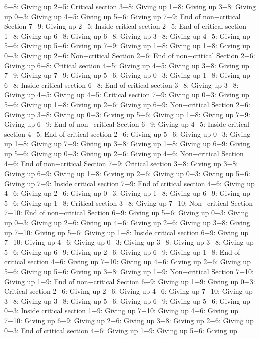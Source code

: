 6−8: Giving up
2−5: Critical section
3−8: Giving up
1−8: Giving up
3−8: Giving up
0−3: Giving up
4−5: Giving up
5−6: Giving up
7−9: End of non−critical Section
7−9: Giving up
2−5: Inside critical section
2−5: End of critical section
1−8: Giving up
6−8: Giving up
6−8: Giving up
3−8: Giving up
4−5: Giving up
5−6: Giving up
5−6: Giving up
7−9: Giving up
1−8: Giving up
1−8: Giving up
0−3: Giving up
2−6: Non−critical Section
2−6: End of non−critical Section
2−6: Giving up
6−8: Critical section
4−5: Giving up
4−5: Giving up
3−8: Giving up
7−9: Giving up
7−9: Giving up
5−6: Giving up
0−3: Giving up
1−8: Giving up
6−8: Inside critical section
6−8: End of critical section
3−8: Giving up
3−8: Giving up
4−5: Giving up
4−5: Critical section
7−9: Giving up
0−3: Giving up
5−6: Giving up
1−8: Giving up
2−6: Giving up
6−9: Non−critical Section
2−6: Giving up
3−8: Giving up
0−3: Giving up
5−6: Giving up
1−8: Giving up
7−9: Giving up
6−9: End of non−critical Section
6−9: Giving up
4−5: Inside critical section
4−5: End of critical section
2−6: Giving up
5−6: Giving up
0−3: Giving up
1−8: Giving up
7−9: Giving up
3−8: Giving up
1−8: Giving up
6−9: Giving up
5−6: Giving up
0−3: Giving up
2−6: Giving up
4−6: Non−critical Section
4−6: End of non−critical Section
7−9: Critical section
3−8: Giving up
3−8: Giving up
6−9: Giving up
1−8: Giving up
2−6: Giving up
0−3: Giving up
5−6: Giving up
7−9: Inside critical section
7−9: End of critical section
4−6: Giving up
4−6: Giving up
2−6: Giving up
0−3: Giving up
1−8: Giving up
6−9: Giving up
5−6: Giving up
1−8: Critical section
3−8: Giving up
7−10: Non−critical Section
7−10: End of non−critical Section
6−9: Giving up
5−6: Giving up
0−3: Giving up
0−3: Giving up
2−6: Giving up
4−6: Giving up
2−6: Giving up
3−8: Giving up
7−10: Giving up
5−6: Giving up
1−8: Inside critical section
6−9: Giving up
7−10: Giving up
4−6: Giving up
0−3: Giving up
3−8: Giving up
3−8: Giving up
5−6: Giving up
6−9: Giving up
2−6: Giving up
6−9: Giving up
1−8: End of critical section
4−6: Giving up
7−10: Giving up
4−6: Giving up
2−6: Giving up
5−6: Giving up
5−6: Giving up
3−8: Giving up
1−9: Non−critical Section
7−10: Giving up
1−9: End of non−critical Section
6−9: Giving up
1−9: Giving up
0−3: Critical section
2−6: Giving up
2−6: Giving up
4−6: Giving up
7−10: Giving up
3−8: Giving up
3−8: Giving up
5−6: Giving up
6−9: Giving up
5−6: Giving up
0−3: Inside critical section
1−9: Giving up
7−10: Giving up
4−6: Giving up
7−10: Giving up
6−9: Giving up
2−6: Giving up
3−8: Giving up
2−6: Giving up
0−3: End of critical section
4−6: Giving up
1−9: Giving up
5−6: Giving up
